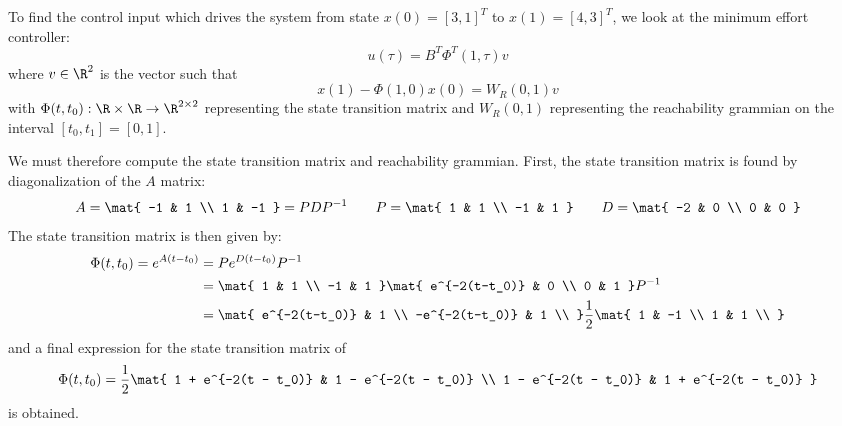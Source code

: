 \documentclass{homework}
\begin{document}
\begin{letterenum}
\item To find the control input which drives the system from state
$x(0) = [3, 1]^T$ to $x(1) = [4, 3]^T$, we look at the minimum
effort controller:
\begin{equation*}
    u(\tau) = B^T \Phi^T(1, \tau) v
\end{equation*}
where $v\in\R^2$ is the vector such that
\begin{equation*}
    x(1) - \Phi(1, 0) x(0) = W_R(0, 1) v
\end{equation*}
with $\Phi(t, t_0): \R \times \R \to \R^{2\times 2}$ representing
the state transition matrix and $W_R(0, 1)$ representing
the reachability grammian on the interval $[t_0, t_1] =[0, 1]$.

We must therefore compute the state transition matrix and reachability
grammian. First, the state transition matrix is found by 
diagonalization of the $A$ matrix:
\begin{equation*}
    A = \mat{
        -1 & 1 \\
        1 & -1
    } = PDP^{-1} \qquad P = \mat{
        1 & 1 \\
        -1 & 1
    } \qquad D = \mat{
        -2 & 0 \\
        0 & 0
    }
\end{equation*}
The state transition matrix is then given by:
\begin{align*}
    \Phi(t, t_0) = e^{A(t - t_0)} &= P e^{D(t-t_0)} P^{-1} \\
        &= \mat{
            1 & 1 \\
            -1 & 1
        } \mat{
            e^{-2(t-t_0)} & 0 \\
            0 & 1
        } P^{-1} \\
        &= \mat{
            e^{-2(t-t_0)} & 1 \\
            -e^{-2(t-t_0)} & 1 \\
        } \frac{1}{2} \mat{
            1 & -1 \\
            1 & 1 \\
        } \\
\end{align*}
and a final expression for the state transition matrix of
\begin{equation}
        \Phi(t, t_0) = \frac{1}{2} \mat{
            1 + e^{-2(t - t_0)} & 1 - e^{-2(t - t_0)} \\
            1 - e^{-2(t - t_0)} & 1 + e^{-2(t - t_0)}
        }
        \label{eq:state-transition}
\end{equation}
is obtained.


\end{letterenum}
\end{document}
